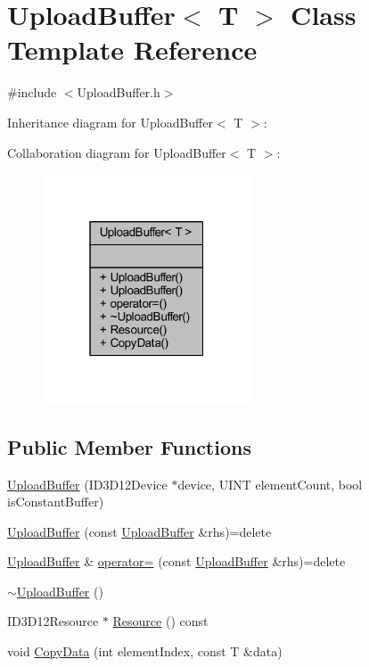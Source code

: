 \hypertarget{class_upload_buffer}{}\section{Upload\+Buffer$<$ T $>$ Class Template Reference}
\label{class_upload_buffer}


{\ttfamily \#include $<$Upload\+Buffer.\+h$>$}



Inheritance diagram for Upload\+Buffer$<$ T $>$\+:


Collaboration diagram for Upload\+Buffer$<$ T $>$\+:\nopagebreak
\begin{figure}[H]
\begin{center}
\leavevmode
\includegraphics[width=175pt]{class_upload_buffer__coll__graph}
\end{center}
\end{figure}
\subsection*{Public Member Functions}
\begin{DoxyCompactItemize}
\item 
\hyperlink{class_upload_buffer_a622fad9645e52e4d6074a2e533165855_a622fad9645e52e4d6074a2e533165855}{Upload\+Buffer} (I\+D3\+D12\+Device $\ast$device, U\+I\+NT element\+Count, bool is\+Constant\+Buffer)
\item 
\hyperlink{class_upload_buffer_aa6d59b50f752d27d3d13cc40fe34db85_aa6d59b50f752d27d3d13cc40fe34db85}{Upload\+Buffer} (const \hyperlink{class_upload_buffer}{Upload\+Buffer} \&rhs)=delete
\item 
\hyperlink{class_upload_buffer}{Upload\+Buffer} \& \hyperlink{class_upload_buffer_ae95078d13ab7815c8c06b50aa28cfe69_ae95078d13ab7815c8c06b50aa28cfe69}{operator=} (const \hyperlink{class_upload_buffer}{Upload\+Buffer} \&rhs)=delete
\item 
\hyperlink{class_upload_buffer_a0e530159492ad21fe575ce0f43e9ebe7_a0e530159492ad21fe575ce0f43e9ebe7}{$\sim$\+Upload\+Buffer} ()
\item 
I\+D3\+D12\+Resource $\ast$ \hyperlink{class_upload_buffer_a615682b96f40e6f6babc0e7d273bacc6_a615682b96f40e6f6babc0e7d273bacc6}{Resource} () const 
\item 
void \hyperlink{class_upload_buffer_a4d9230e295202629d9988c82cd0e78b2_a4d9230e295202629d9988c82cd0e78b2}{Copy\+Data} (int element\+Index, const T \&data)
\end{DoxyCompactItemize}


